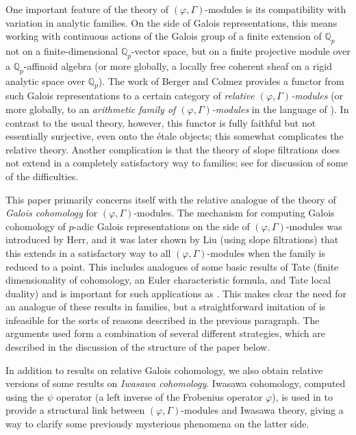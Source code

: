 \documentclass[12pt]{article}
\theoremstyle{definition}
\numberwithin{equation}{theorem}
\newcommand{\QQ}{\mathbb{Q}}
\begin{document}
One important feature of the theory of $(\varphi, \Gamma)$-modules is
its compatibility with variation in
analytic families. On the side of Galois representations, this means
working with continuous actions of
the Galois group of a finite extension of $\QQ_p$ not on a
finite-dimensional $\QQ_p$-vector space, but
on a finite projective module over a $\QQ_p$-affinoid algebra
(or more globally, a locally free coherent
sheaf on a rigid analytic space over $\QQ_p$).
The work of Berger and Colmez \cite{berger-colmez} provides a functor
from such Galois representations to
a certain category of \emph{relative $(\varphi, \Gamma)$-modules} (or
more globally, to an \emph{arithmetic
family of $(\varphi, \Gamma)$-modules} in the language of
\cite{kiran-liu}). In contrast to the usual theory,
however, this functor is fully faithful but not essentially
surjective, even onto the \'etale objects; this somewhat complicates
the relative theory. Another complication is that the theory of slope
filtrations does not extend in a completely satisfactory way to
families; see \cite{kiran-liu} for discussion of some of the
difficulties.

This paper primarily concerns itself with the relative analogue of the theory of
\emph{Galois cohomology} for
$(\varphi, \Gamma)$-modules. The mechanism for computing Galois
cohomology of $p$-adic Galois representations
on the side of $(\varphi, \Gamma)$-modules was introduced by Herr, and
it was later shown by Liu \cite{liu}
(using slope filtrations) that this extends in a satisfactory way to
all $(\varphi, \Gamma)$-modules when the family is reduced to a point.
This includes analogues of some basic results of Tate (finite
dimensionality of cohomology,
an Euler characteristic formula, and Tate local duality) and is
important for such applications as \cite{pottharst1}.
This makes clear the need for an analogue of these results in
families, but a straightforward imitation of
\cite{liu} is infeasible for the sorts of reasons described in the
previous paragraph.
The arguments used form a combination of several different strategies,
which are described in the discussion of the structure of the paper below.

In addition to results on relative Galois cohomology, we also obtain
relative versions of some results
on \emph{Iwasawa cohomology}. Iwasawa cohomology, computed using the
$\psi$ operator
(a left inverse of the Frobenius operator $\varphi$), is used in
\cite{pottharst2} to provide a structural
link between $(\varphi, \Gamma)$-modules and Iwasawa theory, giving a
way to clarify some previously
mysterious phenomena on the latter side.
\end{document}

